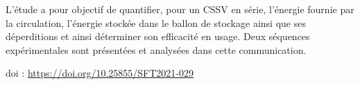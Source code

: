 {L'étude a pour objectif de quantifier, pour un CSSV en série, l'énergie fournie par la circulation, l'énergie stockée dans le ballon de stockage ainsi que ses déperditions et ainsi déterminer son efficacité en usage. Deux séquences expérimentales sont présentées et analysées dans cette communication.

 \vfill doi : \url{https://doi.org/10.25855/SFT2021-029}

}
 
